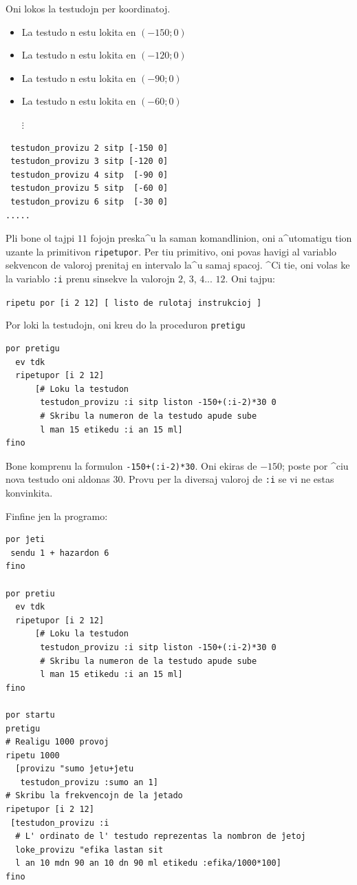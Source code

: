 Oni lokos la testudojn per koordinatoj.
\begin{itemize}
 \item  La testudo n estu lokita en $(-150;0)$
 \item  La testudo n estu lokita en $(-120;0)$
 \item  La testudo n estu lokita en $(-90;0)$
 \item  La testudo n estu lokita en $(-60;0)$\\
\begin{minipage}{8 cm}
\begin{center}
 $\vdots$
\end{center}
\end{minipage}
\end{itemize}
\begin{verbatim}
 testudon_provizu 2 sitp [-150 0]
 testudon_provizu 3 sitp [-120 0]
 testudon_provizu 4 sitp  [-90 0]
 testudon_provizu 5 sitp  [-60 0]
 testudon_provizu 6 sitp  [-30 0]
.....
\end{verbatim}
Pli bone ol tajpi $11$ fojojn preska^u la saman komandlinion, oni
a^utomatigu tion uzante la primitivon \texttt{ripetupor}.  Per tiu
primitivo, oni povas havigi al variablo sekvencon de valoroj prenitaj
en intervalo la^u samaj spacoj.  ^Ci tie, oni volas ke la variablo
\texttt{:i} prenu sinsekve la valorojn $2$, $3$, $4$... $12$.  Oni
tajpu:

\texttt{ripetu por [i 2 12] [ listo de rulotaj instrukcioj ]}

Por loki la testudojn, oni kreu do la proceduron \texttt{pretigu}
\begin{verbatim}
por pretigu
  ev tdk
  ripetupor [i 2 12]  
      [# Loku la testudon
       testudon_provizu :i sitp liston -150+(:i-2)*30 0
       # Skribu la numeron de la testudo apude sube
       l man 15 etikedu :i an 15 ml]
fino
\end{verbatim}

Bone komprenu la formulon \texttt{-150+(:i-2)*30}.  Oni ekiras de
$-150$; poste por ^ciu nova testudo oni aldonas $30$.  Provu per la
diversaj valoroj de \texttt{:i} se vi ne estas konvinkita.

Finfine jen la programo:
\begin{verbatim}
por ĵeti
 sendu 1 + hazardon 6
fino

por pretiu
  ev tdk
  ripetupor [i 2 12]  
      [# Loku la testudon
       testudon_provizu :i sitp liston -150+(:i-2)*30 0
       # Skribu la numeron de la testudo apude sube
       l man 15 etikedu :i an 15 ml]
fino

por startu
pretigu
# Realigu 1000 provoj
ripetu 1000 
  [provizu "sumo ĵetu+ĵetu
   testudon_provizu :sumo an 1]
# Skribu la frekvencojn de la ĵetado
ripetupor [i 2 12] 
 [testudon_provizu :i
  # L' ordinato de l' testudo reprezentas la nombron de ĵetoj
  loke_provizu "efika lastan sit 
  l an 10 mdn 90 an 10 dn 90 ml etikedu :efika/1000*100]
fino
\end{verbatim}

